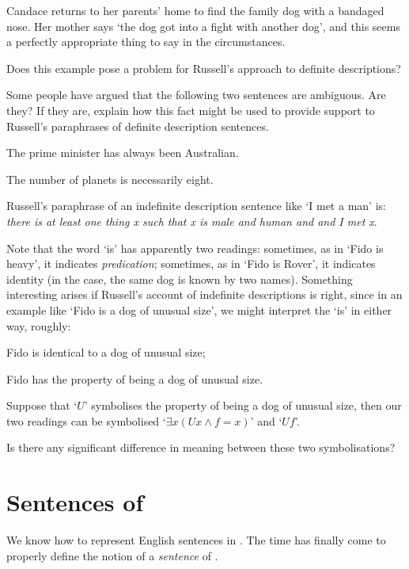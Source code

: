 \problempart
Candace returns to her parents' home to find the family dog with a bandaged nose. Her mother says `the dog got into a fight with another dog', and this seems a perfectly appropriate thing to say in the circumstances. 

Does this example pose a problem for Russell's approach to definite descriptions?




\problempart
Some people have argued that the following two sentences are ambiguous. Are they? If they are, explain how this fact might be used to provide support to Russell's paraphrases of definite description sentences. \begin{earg}
	\item The prime minister has always been Australian.
	\item The number of planets is necessarily eight.
\end{earg}

\problempart
Russell's paraphrase of an indefinite description sentence like `I met a man' is: \emph{there is at least one thing x such that x is male and human and and I met x}. 

Note that the word `is' has apparently two readings: sometimes, as in `Fido is heavy', it indicates \emph{predication}; sometimes, as in `Fido is Rover', it indicates identity (in the case, the same dog is known by two names). Something interesting arises if Russell's account of indefinite descriptions is right, since in an example like `Fido is a dog of unusual size', we might interpret the `is' in either way, roughly:
\begin{earg}
 \item Fido is identical to a dog of unusual size;
 \item Fido has the property of being a dog of unusual size.
 \end{earg} Suppose that `$U$' symbolises the property of being a dog of unusual size, then our two readings can be symbolised `$\exists x (Ux \wedge f=x)$' and `$Uf$'. 

 Is there any significant difference in meaning between these two symbolisations?  






\chapter{Sentences of \textnormal{\FOL}}\label{s:FOLSentences}
We know how to represent English sentences in \FOL. The time has finally come to properly define the notion of a \emph{sentence} of \FOL.

